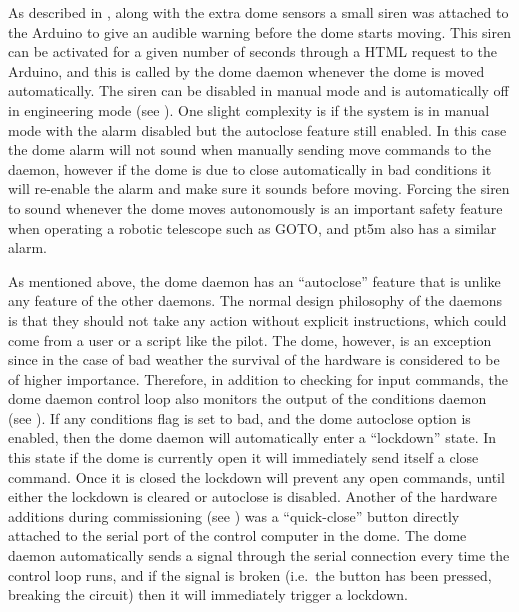 \begin{colsection}
As described in , along with the extra dome sensors a small siren was attached to the Arduino to give an audible warning before the dome starts moving. This siren can be activated for a given number of seconds through a HTML request to the Arduino, and this is called by the dome daemon whenever the dome is moved automatically. The siren can be disabled in manual mode and is automatically off in engineering mode (see ). One slight complexity is if the system is in manual mode with the alarm disabled but the autoclose feature still enabled. In this case the dome alarm will not sound when manually sending move commands to the daemon, however if the dome is due to close automatically in bad conditions it will re-enable the alarm and make sure it sounds before moving. Forcing the siren to sound whenever the dome moves autonomously is an important safety feature when operating a robotic telescope such as GOTO, and pt5m also has a similar alarm.

As mentioned above, the dome daemon has an ``autoclose'' feature that is unlike any feature of the other daemons. The normal design philosophy of the daemons is that they should not take any action without explicit instructions, which could come from a user or a script like the pilot. The dome, however, is an exception since in the case of bad weather the survival of the hardware is considered to be of higher importance. Therefore, in addition to checking for input commands, the dome daemon control loop also monitors the output of the conditions daemon (see ). If any conditions flag is set to bad, and the dome autoclose option is enabled, then the dome daemon will automatically enter a ``lockdown'' state. In this state if the dome is currently open it will immediately send itself a close command. Once it is closed the lockdown will prevent any open commands, until either the lockdown is cleared or autoclose is disabled. Another of the hardware additions during commissioning (see ) was a ``quick-close'' button directly attached to the serial port of the control computer in the dome. The dome daemon automatically sends a signal through the serial connection every time the control loop runs, and if the signal is broken (i.e.\ the button has been pressed, breaking the circuit) then it will immediately trigger a lockdown.


\end{colsection}
